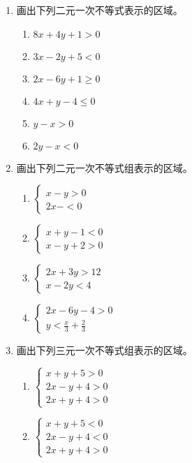 \begin{ex}
\begin{enumerate}
    \item 画出下列二元一次不等式表示的区域。
\begin{multicols}{2}
\begin{enumerate}
    \item $8x+4y+1>0$
    \item $3x-2y+5<0$
    \item $2x-6y+1\ge 0$
    \item $4x+y-4\le 0$
    \item $y-x>0$
    \item $2y-x<0$
\end{enumerate}
\end{multicols}
\item 画出下列二元一次不等式组表示的区域。
\begin{multicols}{2}
\begin{enumerate}
\item $\begin{cases}
    x-y>0\\2x-<0
\end{cases}$
\item $\begin{cases}
    x+y-1<0\\x-y+2>0
\end{cases}$
\item $\begin{cases}
    2x+3y>12\\ x-2y<4
\end{cases}$
\item $\begin{cases}
    2x-6y-4>0\\ y<\frac{x}{3}+\frac{2}{3}
\end{cases}$
\end{enumerate}
\end{multicols}
    \item 画出下列三元一次不等式组表示的区域。
\begin{multicols}{2}
\begin{enumerate}    
    \item $\begin{cases}
        x+y+5>0\\2x-y+4>0\\2x+y+4>0
    \end{cases}$
    \item $\begin{cases}
        x+y+5<0\\2x-y+4<0\\2x+y+4>0
    \end{cases}$
\end{enumerate}
\end{multicols}
\end{enumerate}
\end{ex}

